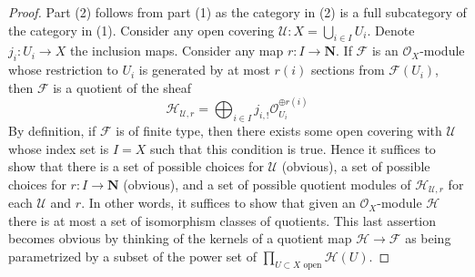 \documentclass[10pt,a4paper]{amsart}
\theoremstyle{plain}
\theoremstyle{definition}
\theoremstyle{remark}
\numberwithin{equation}{subsection}
\begin{document}
\begin{proof}
Part (2) follows from part (1) as the category in (2) is a full subcategory
of the category in (1). Consider any open covering
$\mathcal{U} : X = \bigcup_{i \in I} U_i$. Denote $j_i : U_i \to X$
the inclusion maps. Consider any map $r : I \to \mathbf{N}$.
If $\mathcal{F}$ is an $\mathcal{O}_X$-module whose restriction to
$U_i$ is generated by at most $r(i)$ sections from $\mathcal{F}(U_i)$,
then $\mathcal{F}$ is a quotient of the sheaf
$$
\mathcal{H}_{\mathcal{U}, r} =
\bigoplus\nolimits_{i \in I} j_{i, !}\mathcal{O}_{U_i}^{\oplus r(i)}
$$
By definition, if $\mathcal{F}$ is of finite type, then there exists
some open covering with $\mathcal{U}$ whose index set is $I = X$
such that this condition is true. Hence it suffices to show that
there is a set of possible choices for $\mathcal{U}$ (obvious),
a set of possible choices for $r : I \to \mathbf{N}$ (obvious), and
a set of possible quotient modules of $\mathcal{H}_{\mathcal{U}, r}$
for each $\mathcal{U}$ and $r$. In other words, it suffices to show
that given an $\mathcal{O}_X$-module $\mathcal{H}$ there is at most
a set of isomorphism classes of quotients.
This last assertion becomes obvious
by thinking of the kernels of a quotient map
$\mathcal{H} \to \mathcal{F}$
as being parametrized by a subset of the power set of
$\prod_{U \subset X\text{ open}} \mathcal{H}(U)$.
\end{proof}
\end{document}
